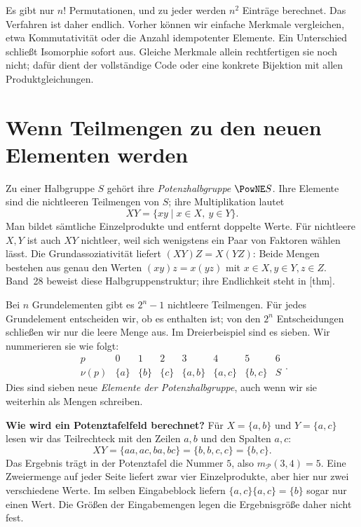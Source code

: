 Es gibt nur \(n!\) Permutationen, und zu jeder werden \(n^2\)
Einträge berechnet. Das Verfahren ist daher endlich. Vorher können
wir einfache Merkmale vergleichen, etwa Kommutativität oder die
Anzahl idempotenter Elemente. Ein Unterschied schließt Isomorphie
sofort aus. Gleiche Merkmale allein rechtfertigen sie noch nicht;
dafür dient der vollständige Code oder eine konkrete Bijektion mit
allen Produktgleichungen.

\section*{Wenn Teilmengen zu den neuen Elementen werden}
\hypertarget{finite-semigroups.reading.subsets}{}

Zu einer Halbgruppe \(S\) gehört ihre \emph{Potenzhalbgruppe}
\(\PowNE S\). Ihre Elemente sind die nichtleeren Teilmengen von
\(S\); ihre Multiplikation lautet
\[
  XY=\{xy\mid x\in X,\ y\in Y\}.
\]
Man bildet sämtliche Einzelprodukte und entfernt doppelte Werte.
Für nichtleere \(X,Y\) ist auch \(XY\) nichtleer, weil sich wenigstens
ein Paar von Faktoren wählen lässt. Die Grundassoziativität liefert
\((XY)Z=X(YZ)\): Beide Mengen bestehen aus genau den Werten
\((xy)z=x(yz)\) mit \(x\in X,y\in Y,z\in Z\).
Band~28 beweist diese Halbgruppenstruktur; ihre Endlichkeit steht in
[thm].

Bei \(n\) Grundelementen gibt es \(2^n-1\) nichtleere Teilmengen.
Für jedes Grundelement entscheiden wir, ob es enthalten ist; von
den \(2^n\) Entscheidungen schließen wir nur die leere Menge aus.
Im Dreierbeispiel sind es sieben. Wir nummerieren sie wie folgt:
\[
  \begin{array}{c|ccccccc}
    p&0&1&2&3&4&5&6\\\hline
    \nu(p)&\{a\}&\{b\}&\{c\}&\{a,b\}&\{a,c\}&\{b,c\}&S
  \end{array}.
\]
Dies sind sieben neue \emph{Elemente der Potenzhalbgruppe}, auch wenn
wir sie weiterhin als Mengen schreiben.

\medskip\noindent\textbf{Wie wird ein Potenztafelfeld berechnet?}
Für \(X=\{a,b\}\) und \(Y=\{a,c\}\) lesen wir das Teilrechteck
mit den Zeilen \(a,b\) und den Spalten \(a,c\):
\[
  XY=\{aa,ac,ba,bc\}=\{b,b,c,c\}=\{b,c\}.
\]
Das Ergebnis trägt in der Potenztafel die Nummer \(5\), also
\(m_{\mathcal P}(3,4)=5\).
Eine Zweiermenge auf jeder Seite liefert zwar vier Einzelprodukte,
aber hier nur zwei verschiedene Werte. Im selben Eingabeblock
liefern \(\{a,c\}\{a,c\}=\{b\}\) sogar nur einen Wert. Die Größen
der Eingabemengen legen die Ergebnisgröße daher nicht fest.


